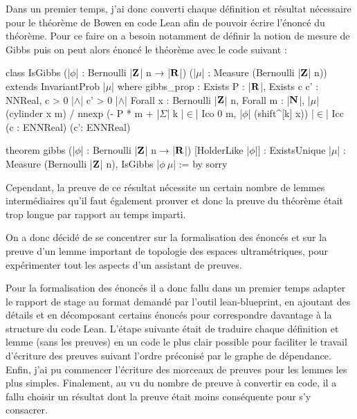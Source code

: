 \documentclass[../../rapport.tex]{subfiles}
\begin{document}
  Dans un premier temps, j'ai donc converti chaque définition et résultat nécessaire pour le théorème de Bowen en code Lean
  afin de pouvoir écrire l'énoncé du théorème.
  Pour ce faire on a besoin notamment de définir la notion de mesure de Gibbs puis on peut alors énoncé le théorème
  avec le code suivant :
  \pagebreak

  \begin{lean4code}
    class IsGibbs (|$\phi$| : Bernoulli |$\mathbf Z$| n → |$\mathbf R$|) (|$\mu$| : Measure (Bernoulli |$\mathbf Z$| n))
    extends InvariantProb |$\mu$| where
      gibbs_prop : Exists P : |$\mathbf R$|, Exists c c' : NNReal, c > 0 |$\wedge$| c' > 0 |$\wedge$|
      Forall x : Bernoulli |$\mathbf Z$| n, Forall m : |$\mathbf N$|,
    |$\mu$| (cylinder x m) / nnexp (- P * m + |$\Sigma$| k |$\in$| Ico 0 m, |$\phi$| (shift^[k] x))
      |$\in$| Icc (c : ENNReal) (c': ENNReal)
  \end{lean4code}

  \begin{lean4code}
    theorem gibbs (|$\phi$| : Bernoulli |$\mathbf Z$| n → |$\mathbf R$|) [HolderLike |$\phi$|] :
      ExistsUnique |$\mu$| : Measure (Bernoulli |$\mathbf Z$| n), IsGibbs |$\phi\ \mu$| := by sorry
  \end{lean4code}

  Cependant, la preuve de ce résultat nécessite un certain nombre de lemmes intermédiaires qu'il faut également prouver
  et donc la preuve du théorème était trop longue par rapport au temps imparti.

  On a donc décidé de se concentrer sur la formalisation des énoncés et sur la preuve d'un lemme important
  de topologie des espaces ultramétriques, pour expérimenter tout les aspects d'un assistant de preuves.

  Pour la formalisation des énoncés il a donc fallu dans un premier temps adapter le rapport de stage au format demandé
  par l'outil lean-blueprint, en ajoutant des détails et en décomposant certains énoncés pour correspondre davantage à la structure
  du code Lean. L'étape suivante était de traduire chaque définition et lemme (sans les preuves) en un code le plus clair possible
  pour faciliter le travail d'écriture des preuves suivant l'ordre préconisé par le graphe de dépendance.
  Enfin, j'ai pu commencer l'écriture des morceaux de preuves pour les lemmes les plus simples.
  Finalement, au vu du nombre de preuve à convertir en code, il a fallu choisir un résultat dont la
  preuve était moins conséquente pour s'y consacrer.
\end{document}
